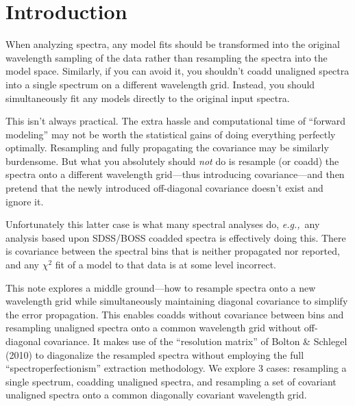 \documentclass[12pt]{article}
\begin{document}
\maketitle


\section{Introduction}

When analyzing spectra, any model fits should be transformed into the original
wavelength sampling of the data rather than resampling the
spectra into the model space.  Similarly, if you can avoid it, you shouldn't
coadd unaligned spectra into a single spectrum on a different wavelength
grid.  Instead, you should simultaneously fit any models directly
to the original input spectra.

This isn't always practical.  The extra hassle and
computational time of
``forward modeling'' may not be worth the statistical gains of doing
everything perfectly optimally.  Resampling and fully propagating the
covariance may be similarly burdensome.
But what you absolutely should
\emph{not} do is resample (or coadd) the spectra onto a different
wavelength grid---thus introducing covariance---and then pretend
that the newly introduced off-diagonal covariance doesn't exist and
ignore it.

Unfortunately this latter case is what many spectral analyses do,
{\it e.g.,}~any analysis based upon SDSS/BOSS coadded spectra is effectively
doing this.  There is covariance between the spectral bins that is neither
propagated nor reported, and any $\chi^2$ fit of a model to that data is
at some level incorrect.

This note explores a middle ground---how to resample spectra onto a new
wavelength grid while simultaneously maintaining diagonal
covariance to simplify the error propagation.  This enables coadds without
covariance between bins and resampling unaligned spectra onto a common
wavelength grid without off-diagonal covariance.  It makes use of the
``resolution matrix'' of Bolton \& Schlegel (2010) to diagonalize the
resampled spectra without employing the full ``spectroperfectionism''
extraction methodology.
We explore 3 cases: resampling a single
spectrum, coadding unaligned spectra, and resampling a set of covariant
unaligned spectra onto a common diagonally covariant wavelength grid.
\end{document}
